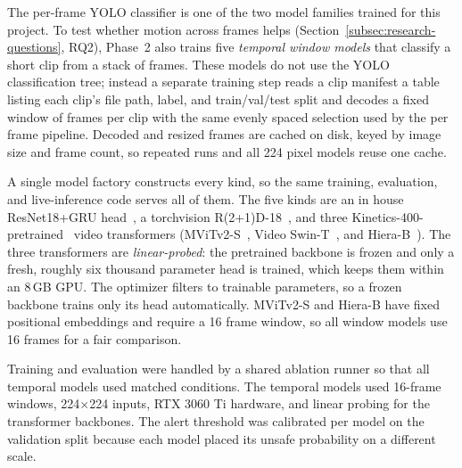 \documentclass[conference]{IEEEtran}
\begin{document}
The per-frame YOLO classifier is one of the two model families trained for
this project. To test whether motion across frames helps
(Section~\ref{subsec:research-questions}, RQ2), Phase~2 also trains five
\emph{temporal window models} that classify a short clip from a stack of
frames. These models do not use the YOLO classification tree; instead a separate
training step reads a clip manifest a table listing each clip's file path,
label, and train/val/test split and decodes a fixed window of frames per clip
with the same evenly spaced selection used by the per frame pipeline. Decoded
and resized frames are cached on disk, keyed by image size and frame
count, so repeated runs and all 224 pixel models reuse one cache.

A single model factory constructs every
kind, so the same training, evaluation, and live-inference code
serves all of them. The five kinds are an in house ResNet18+GRU
head~\cite{b11,b12}, a torchvision R(2+1)D-18~\cite{b7}, and three
Kinetics-400-pretrained~\cite{b13} video transformers
(MViTv2-S~\cite{b8}, Video Swin-T~\cite{b9}, and Hiera-B~\cite{b10}).
The three transformers
are \emph{linear-probed}: the pretrained backbone is frozen and only a
fresh, roughly six thousand parameter head is trained, which keeps them
within an 8\,GB GPU. The optimizer filters to trainable parameters, so a
frozen backbone trains only its head automatically. MViTv2-S and Hiera-B
have fixed positional embeddings and require a 16 frame window, so all
window models use 16 frames for a fair comparison.

Training and evaluation were handled by a shared ablation runner so that all
temporal models used matched conditions. The temporal models used 16-frame
windows, 224$\times$224 inputs, RTX 3060 Ti hardware, and linear probing for the
transformer backbones. The alert threshold was calibrated per model on the
validation split because each model placed its unsafe probability on a different
scale.

\end{document}
